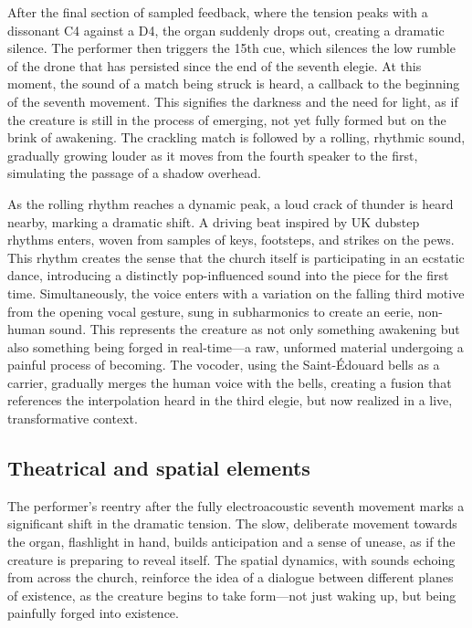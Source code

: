 \documentclass[12pt,twoside,maitrise]{dms_ks}
\theoremstyle{definition}
\begin{document}

After the final section of sampled feedback, where the tension peaks with a dissonant C4 against a D4, the organ suddenly drops out, creating a dramatic silence. 
The performer then triggers the 15th cue, which silences the low rumble of the drone that has persisted since the end of the seventh elegie. 
At this moment, the sound of a match being struck is heard, a callback to the beginning of the seventh movement. 
This signifies the darkness and the need for light, as if the creature is still in the process of emerging, not yet fully formed but on the brink of awakening. 
The crackling match is followed by a rolling, rhythmic sound, gradually growing louder as it moves from the fourth speaker to the first, simulating the passage of a shadow overhead.

As the rolling rhythm reaches a dynamic peak, a loud crack of thunder is heard nearby, marking a dramatic shift. 
A driving beat inspired by UK dubstep rhythms enters, woven from samples of keys, footsteps, and strikes on the pews. 
This rhythm creates the sense that the church itself is participating in an ecstatic dance, introducing a distinctly pop-influenced sound into the piece for the first time. 
Simultaneously, the voice enters with a variation on the falling third motive from the opening vocal gesture, sung in subharmonics to create an eerie, non-human sound. 
This represents the creature as not only something awakening but also something being forged in real-time—a raw, unformed material undergoing a painful process of becoming. 
The vocoder, using the Saint-Édouard bells as a carrier, gradually merges the human voice with the bells, creating a fusion that references the interpolation heard in the third elegie, but now realized in a live, transformative context.


\subsection{Theatrical and spatial elements}

The performer’s reentry after the fully electroacoustic seventh movement marks a significant shift in the dramatic tension. 
The slow, deliberate movement towards the organ, flashlight in hand, builds anticipation and a sense of unease, as if the creature is preparing to reveal itself. 
The spatial dynamics, with sounds echoing from across the church, reinforce the idea of a dialogue between different planes of existence, as the creature begins to take form—not just waking up, but being painfully forged into existence.
\end{document}
